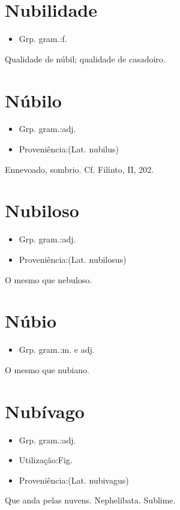 \section{Nubilidade}
\begin{itemize}
\item {Grp. gram.:f.}
\end{itemize}
Qualidade de núbil; qualidade de casadoiro.
\section{Núbilo}
\begin{itemize}
\item {Grp. gram.:adj.}
\end{itemize}
\begin{itemize}
\item {Proveniência:(Lat. \textunderscore nubilus\textunderscore )}
\end{itemize}
Ennevoado, sombrio. Cf. Filinto, II, 202.
\section{Nubiloso}
\begin{itemize}
\item {Grp. gram.:adj.}
\end{itemize}
\begin{itemize}
\item {Proveniência:(Lat. \textunderscore nubilosus\textunderscore )}
\end{itemize}
O mesmo que \textunderscore nebuloso\textunderscore .
\section{Núbio}
\begin{itemize}
\item {Grp. gram.:m.  e  adj.}
\end{itemize}
O mesmo que \textunderscore nubiano\textunderscore .
\section{Nubívago}
\begin{itemize}
\item {Grp. gram.:adj.}
\end{itemize}
\begin{itemize}
\item {Utilização:Fig.}
\end{itemize}
\begin{itemize}
\item {Proveniência:(Lat. \textunderscore nubivagus\textunderscore )}
\end{itemize}
Que anda pelas nuvens.
Nephelibata.
Sublime.
